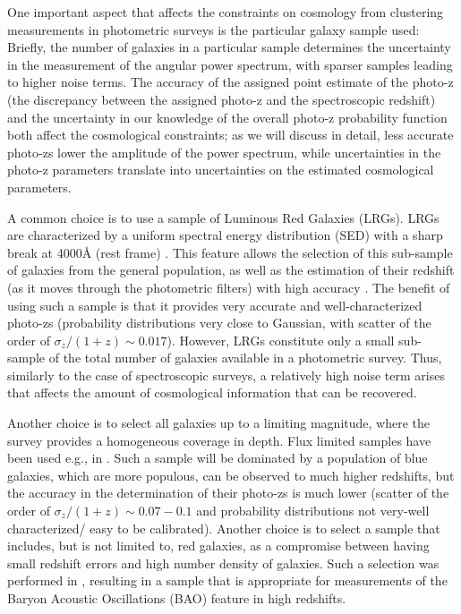 \documentclass[a4paper,fleqn,usenatbib]{mnras}
\begin{document}
One important aspect that affects the constraints on cosmology from clustering measurements in photometric surveys is the particular galaxy sample used: Briefly, the number of galaxies in a particular sample determines the uncertainty in the measurement of the angular power spectrum, with sparser samples leading to higher noise terms. The accuracy of the assigned point estimate of the photo-z (the discrepancy between the assigned   photo-z and the spectroscopic redshift) and the uncertainty in our knowledge of the overall photo-z probability function  both affect the cosmological constraints; as we will discuss in detail, less accurate photo-zs lower the amplitude of the power spectrum, while uncertainties in the photo-z parameters translate into uncertainties on the estimated cosmological parameters.

A common choice is to use a sample of Luminous Red Galaxies (LRGs).  LRGs are characterized by a uniform spectral energy distribution (SED)  with a sharp break at 4000{\AA} (rest frame) \citep{Eisenstein2001}. This feature allows the selection of this sub-sample of galaxies from the general population, as well as the estimation of their redshift (as it moves through the photometric filters) with high accuracy \citep{Padmanabhan2005, Rozo2016}. The benefit of using such a sample is that it provides very accurate and well-characterized photo-zs (probability distributions very close to Gaussian, with scatter of the order of $\sigma_{z}/(1 + z) \sim 0.017$). However, LRGs constitute only a small sub-sample of the total number of galaxies available in a photometric survey. Thus, similarly to the case of spectroscopic surveys, a relatively high noise term arises that affects the amount of cosmological information that can be recovered.

Another choice is to select all galaxies up to a limiting magnitude, where the survey provides a homogeneous coverage in depth. Flux limited samples have been used e.g.,  in \citealt{Crocce2016,Balaguera2018}. Such a sample will be dominated by a population of blue galaxies, which are more populous, can be observed to much higher redshifts, but the accuracy in the determination of their photo-zs is much lower (scatter of the order of $\sigma_{z}/(1 + z) \sim 0.07-0.1$ and  probability distributions not very-well characterized/ easy to be calibrated).  Another choice is to select a sample that includes, but is not limited to, red galaxies, as a compromise between having small redshift errors and high number density of galaxies. Such a selection was performed in \citep{Crocce2019} , resulting in a sample that is appropriate for measurements of the Baryon Acoustic Oscillations (BAO) feature in high redshifts.
\end{document}
